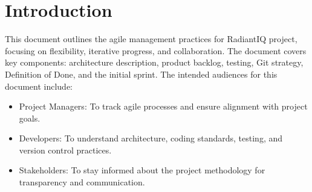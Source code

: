 \section{Introduction} \label{introduction}

This document outlines the agile management practices for RadiantIQ project, focusing on flexibility, iterative progress, and collaboration. The document covers key components: architecture description, product backlog, testing, Git strategy, Definition of Done, and the initial sprint. The intended audiences for this document include:

\begin{itemize}
    \item Project Managers: To track agile processes and ensure alignment with project goals.
    \item Developers: To understand architecture, coding standards, testing, and version control practices.
    \item Stakeholders: To stay informed about the project methodology for transparency and communication.
\end{itemize}